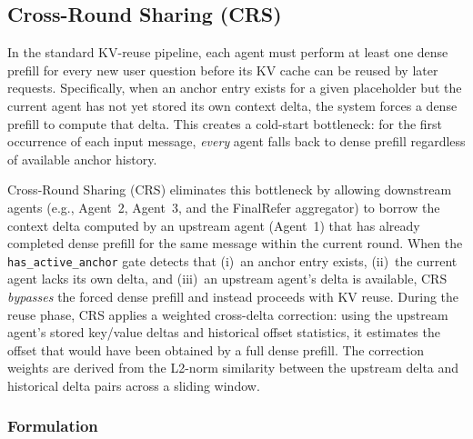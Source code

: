 
\subsection{Cross-Round Sharing (CRS)}
\label{sec:crs}

In the standard KV-reuse pipeline, each agent must perform at least one
dense prefill for every new user question before its KV cache can be
reused by later requests.  Specifically, when an anchor entry exists for
a given placeholder but the current agent has not yet stored its own
context delta, the system forces a dense prefill to compute that delta.
This creates a cold-start bottleneck: for the first occurrence of each
input message, \emph{every} agent falls back to dense prefill regardless
of available anchor history.

Cross-Round Sharing (CRS) eliminates this bottleneck by allowing
downstream agents (e.g., Agent~2, Agent~3, and the FinalRefer aggregator)
to borrow the context delta computed by an upstream agent (Agent~1) that
has already completed dense prefill for the same message within the
current round.  When the \texttt{has\_active\_anchor} gate detects that
(i)~an anchor entry exists, (ii)~the current agent lacks its own delta,
and (iii)~an upstream agent's delta is available, CRS \emph{bypasses} the
forced dense prefill and instead proceeds with KV reuse.  During the
reuse phase, CRS applies a weighted cross-delta correction: using the
upstream agent's stored key/value deltas and historical offset statistics,
it estimates the offset that would have been obtained by a full dense
prefill.  The correction weights are derived from the L2-norm similarity
between the upstream delta and historical delta pairs across a sliding
window.

\subsubsection{Formulation}

